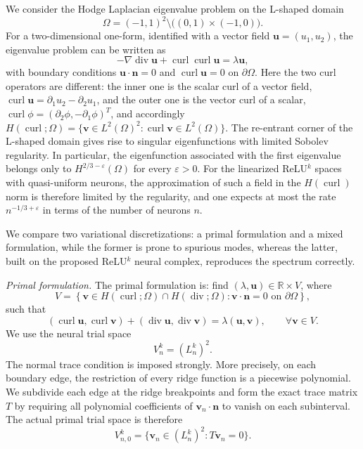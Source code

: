 \documentclass[pdflatex,sn-mathphys-num]{sn-jnl}
\numberwithin{equation}{section}
\numberwithin{theorem}{section}
\numberwithin{table}{section}
\numberwithin{figure}{section}
\begin{document}
We consider the Hodge Laplacian eigenvalue problem on the L-shaped domain
\[
\Omega=(-1,1)^2\setminus\bigl((0,1)\times(-1,0)\bigr).
\]
For a two-dimensional one-form, identified with a vector field
\(\boldsymbol u=(u_1,u_2)\), the eigenvalue problem can be written as
\[
-\nabla\operatorname{div}\boldsymbol u
+
\operatorname{curl}\operatorname{curl}\boldsymbol u
=
\lambda \boldsymbol u ,
\]
with boundary conditions $\boldsymbol u\cdot\boldsymbol n=0$ and
$\operatorname{curl}\boldsymbol u=0$ on $\partial\Omega$. Here the two curl operators are different: the inner one is the scalar
curl of a vector field,
$\operatorname{curl}\boldsymbol u=\partial_1u_2-\partial_2u_1$, and the
outer one is the vector curl of a scalar,
$\operatorname{curl}\phi=(\partial_2\phi,-\partial_1\phi)^T$, and accordingly
$H(\operatorname{curl};\Omega)=\{\boldsymbol v\in L^2(\Omega)^2:
\operatorname{curl}\boldsymbol v\in L^2(\Omega)\}$. The re-entrant corner of the L-shaped domain gives rise to singular eigenfunctions with limited Sobolev regularity.  In particular, the eigenfunction associated with the first eigenvalue belongs only to $H^{2/3-\varepsilon}(\Omega)$ for every $\varepsilon>0$.
For the linearized ReLU$^k$ spaces with quasi-uniform neurons, the
approximation of such a field in the $H(\operatorname{curl})$ norm is
therefore limited by the regularity, and one
expects at most the rate $n^{-1/3+\varepsilon}$ in terms of the number of
neurons $n$.  

We compare two variational discretizations: a primal formulation and a
mixed formulation, while the former is prone to spurious modes, whereas the latter, built on the proposed ReLU$^k$ neural complex, reproduces the spectrum correctly.

\textit{Primal formulation.} The primal formulation is: find
\((\lambda,\boldsymbol u)\in\mathbb R\times V\), where
\[
  V=
  \left\{
  \boldsymbol v\in H(\operatorname{curl};\Omega)\cap
  H(\operatorname{div};\Omega):
  \boldsymbol v\cdot \boldsymbol n=0
  \text{ on }\partial\Omega
  \right\},
\]
such that
\[
  (\operatorname{curl}\boldsymbol u,\operatorname{curl}\boldsymbol v)
  +
  (\operatorname{div}\boldsymbol u,\operatorname{div}\boldsymbol v)
  =
  \lambda(\boldsymbol u,\boldsymbol v),
  \qquad \forall \boldsymbol v\in V .
\]
We use the neural trial space
\[
V_n^k=(L_n^k)^2 .
\]
The normal trace condition is imposed strongly. More precisely, on each
boundary edge, the restriction of every ridge function is a piecewise
polynomial. We subdivide each edge at the ridge breakpoints and form the
exact trace matrix \(T\) by requiring all polynomial coefficients of
\(\boldsymbol v_n\cdot\boldsymbol n\) to vanish on each subinterval. The
actual primal trial space is therefore
\[
  V_{n,0}^k
  =
  \{\boldsymbol v_n\in (L_n^k)^2:T\boldsymbol v_n=0\}.
\]
\end{document}
